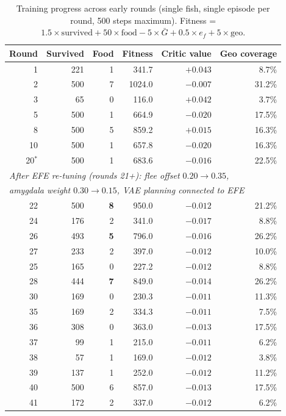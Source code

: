 \documentclass[12pt]{article}
\begin{document}
\begin{table}[H]
\centering
\caption{Training progress across early rounds (single fish,
  single episode per round, 500 steps maximum).
  Fitness = $1.5 \times \text{survived} + 50 \times \text{food}
  - 5 \times \bar{G} + 0.5 \times e_f + 5 \times \text{geo}$.}
\label{tab:training}
\small
\begin{tabular}{rrrrrr}
\toprule
Round & Survived & Food & Fitness & Critic value & Geo coverage \\
\midrule
1 & 221 & 1 & 341.7 & $+0.043$ & 8.7\% \\
2 & 500 & 7 & 1024.0 & $-0.007$ & 31.2\% \\
3 & 65  & 0 & 116.0  & $+0.042$ & 3.7\% \\
5 & 500 & 1 & 664.9  & $-0.020$ & 17.5\% \\
8 & 500 & 5 & 859.2  & $+0.015$ & 16.3\% \\
10 & 500 & 1 & 657.8  & $-0.020$ & 16.3\% \\
20$^*$ & 500 & 1 & 683.6  & $-0.016$ & 22.5\% \\
\midrule
\multicolumn{6}{l}{\textit{After EFE re-tuning (rounds 21+): flee offset $0.20\to0.35$,}} \\
\multicolumn{6}{l}{\textit{amygdala weight $0.30\to0.15$, VAE planning connected to EFE}} \\
\midrule
22 & 500 & \textbf{8} & 950.0  & $-0.012$ & 21.2\% \\
24 & 176 & 2 & 341.0  & $-0.017$ & 8.8\% \\
26 & 493 & \textbf{5} & 796.0  & $-0.016$ & 26.2\% \\
27 & 233 & 2 & 397.0  & $-0.012$ & 10.0\% \\
25 & 165 & 0 & 227.2  & $-0.012$ & 8.8\% \\
28 & 444 & \textbf{7} & 849.0  & $-0.014$ & 26.2\% \\
30 & 169 & 0 & 230.3  & $-0.011$ & 11.3\% \\
35 & 169 & 2 & 334.3  & $-0.011$ & 7.5\% \\
36 & 308 & 0 & 363.0  & $-0.013$ & 17.5\% \\
37 & 99  & 1 & 215.0  & $-0.011$ & 6.2\% \\
38 & 57  & 1 & 169.0  & $-0.012$ & 3.8\% \\
39 & 137 & 1 & 252.0  & $-0.012$ & 11.2\% \\
40 & 500 & 6 & 857.0  & $-0.013$ & 17.5\% \\
41 & 172 & 2 & 337.0  & $-0.012$ & 6.2\% \\

\end{tabular}
\end{table}
\end{document}
